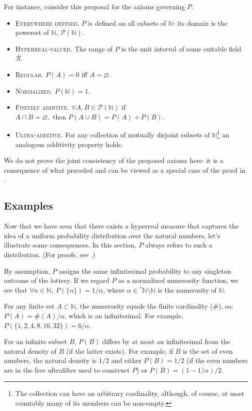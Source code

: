 For instance, consider this proposal for the axioms governing $P$.
\begin{itemize}
  \item[] \textsc{Everywhere defined.} $P$ is defined on all subsets of $\mathbb{N}$: its domain is the powerset of $\mathbb{N}$, $\mathcal{P}(\mathbb{N})$.
  \item[] \textsc{Hyperreal-valued.} The range of $P$ is the unit interval of some suitable field $\mathcal{R}$.
  \item[] \textsc{Regular.} $P(A) = 0$ iff $A = \varnothing$.
  \item[] \textsc{Normalized.} $P(\mathbb{N})=1$.
  \item[] \textsc{Finitely additive.} $\forall A,B \in \mathcal{P}(\mathbb{N})$ if $A \cap B =\varnothing, \textrm{\ then\ } P(A \cup B) = P(A) + P(B)$.
  \item[] \textsc{Ultra-additive.} For any collection of mutually disjoint subsets of $\mathbb{N}$\footnote{The collection can have an arbitrary cardinality, although, of course, at most countably many of its members can be non-empty.} an analogous additivity property holds.
\end{itemize}
We do not prove the joint consistency of the proposed axioms here: it is a consequence of what preceded and can be viewed as a special case of the proof in \citet{Benci_etal:2013}.

\subsection{Examples}
Now that we have seen that there exists a hyperreal measure that captures the idea of a uniform probability distribution over the natural numbers, let's illustrate some consequences. In this section, $P$ always refers to such a distribution. (For proofs, see \citealt{Benci_etal:2013}.)

By assumption, $P$ assigns the same infinitesimal probability to any singleton outcome of the lottery. If we regard $P$ as a normalized numerosity function, we see that $\forall n \in \mathbb{N},\ P(\{n\})=1/\alpha$, where $\alpha \in {^\ast\mathbb{N}} \setminus \mathbb{N}$ is the numerosity of $\mathbb{N}$.

For any finite set $A \subset \mathbb{N}$, the numerosity equals the finite cardinality ($\#$), so: $P(A)=\#(A)/\alpha$, which is an infinitesimal. For example, $P(\{1,2,4,8,16,32\}) = 6/\alpha$.

For an infinite subset $B$, $P(B)$ differs by at most an infinitesimal from the natural density of $B$ (if the latter exists). For example, if $B$ is the set of even numbers, the natural density is $1/2$ and either $P(B)=1/2$ (if the even numbers are in the free ultrafilter used to construct $P$) or $P(B)=(1-1/\alpha)/2$.

